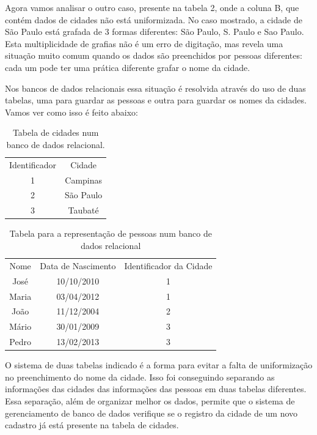 Agora vamos analisar o outro caso, presente na tabela 2, onde a coluna B, que contém dados de cidades não está uniformizada. No caso mostrado, a cidade de São Paulo está grafada de 3 formas diferentes: São Paulo, S. Paulo e Sao Paulo. Esta multiplicidade de grafias não é um erro de digitação, mas revela uma situação muito comum quando os dados são preenchidos por pessoas diferentes: cada um pode ter uma prática diferente grafar o nome da cidade.

Nos bancos de dados relacionais essa situação é resolvida através do uso de duas tabelas, uma para guardar as pessoas e outra para guardar os nomes da cidades. Vamos ver como isso é feito abaixo:





\begin{table}[htb]
\tiny
\caption{\label{4883c3afd4a0b5e448ba69a9fdcab58109b493a2}Tabela de cidades num banco de dados relacional.}

\centering
\begin{tabular}{|c|c|}
\hline
Identificador  &  Cidade \\
1  &  Campinas \\
2  &  São Paulo \\
3  &  Taubaté \\
\hline
\end{tabular}
\end{table}






\begin{table}[htb]
\tiny
\caption{\label{7135be2c9aba27f41552970a14d66e7834ef1892}Tabela para a representação de pessoas num banco de dados relacional}

\centering
\begin{tabular}{|c|c|c|}
\hline
Nome  &  Data de Nascimento  &  Identificador da Cidade \\
José  &  10/10/2010  &  1 \\
Maria  & 03/04/2012  &  1 \\
João  &  11/12/2004  &  2 \\
Mário  & 30/01/2009  &  3 \\
Pedro  & 13/02/2013  &  3 \\
\hline
\end{tabular}
\end{table}


O sistema de duas tabelas indicado é a forma para evitar a falta de uniformização no preenchimento do nome da cidade. Isso foi conseguindo separando as informações das cidades das informações das pessoas em duas tabelas diferentes. Essa separação, além de organizar melhor os dados, permite que o sistema de gerenciamento de banco de dados verifique se o registro da cidade de um novo cadastro já está presente na tabela de cidades.

